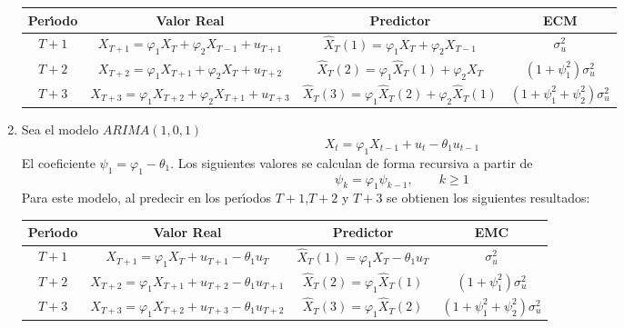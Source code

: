 \begin{ejemplo}
\begin{enumerate}
\begin{center}\small
\begin{tabular}{@{}cccc@{}}
\toprule
\textbf{Per\'{\i}odo}& \textbf{Valor Real}& \textbf{Predictor}& \textbf{ECM} \\
\midrule
$T+1$& $X_{T+1} =\varphi_{1} X_{T} +\varphi_{2} X_{T-1} +u_{T+1} $& $\widehat{{X}}_{T} \left( 1 \right)=\varphi_{1} X_{T} +\varphi_{2} X_{T-1} $& $\sigma_{u}^{2}$ \\[5pt]
$T+2$& $X_{T+2} =\varphi_{1} X_{T+1} +\varphi_{2} X_{T} +u_{T+2} $& $\widehat{{X}}_{T} \left( 2 \right)=\varphi_{1} \widehat{{X}}_{T} \left( 1 \right)+\varphi_{2} X_{T} $& 
$\left( {1+\psi_{1}^{2} } \right)\sigma_{u}^{2} $ \\[5pt]
$T+3$& $X_{T+3} =\varphi_{1} X_{T+2} +\varphi_{2} X_{T+1} +u_{T+3} $& $\widehat{{X}}_{T} \left( 3 \right)=\varphi_{1} \widehat{{X}}_{T} \left( 2 \right)+\varphi_{2} \widehat{{X}}_{T} \left( 1 \right)$& $\left( {1+\psi_{1}^{2} +\psi_{2}^{2} } \right)\sigma_{u}^{2} $ \\
\bottomrule
\end{tabular}
\end{center}


\item Sea el modelo $ARIMA( {1,0,1})$
\[
X_{t} =\varphi_{1} X_{t-1} +u_{t} -\theta_{1} u_{t-1} 
\]
El coeficiente $\psi_{1} =\varphi_{1} -\theta_{1} .$ Los siguientes 
valores se calculan de forma recursiva a partir de
\[
\psi_{k} =\varphi_{1} \psi_{k-1} ,\quad \quad k\ge 1
\]
Para este modelo, al predecir en los per\'{\i}odos 
$T+1$,$T+2$ y $T+3$ se obtienen los siguientes resultados:


\begin{center}\small
\begin{tabular}{@{}cccc@{}}
\toprule
\textbf{Per\'{\i}odo}& \textbf{Valor Real}& \textbf{Predictor}& \textbf{EMC} \\
\midrule
$T+1$& $X_{T+1} =\varphi_{1} X_{T} +u_{T+1} -\theta_{1} u_{T} $& $\widehat{X}_{T} (1)=\varphi_{1} X_{T} -\theta_{1} u_{T} $& $\sigma_{u}^{2} $ \\[5pt]
$T+2$& $X_{T+2} =\varphi_{1} X_{T+1} +u_{T+2} -\theta_{1} u_{T+1} $& $\widehat{X}_{T} (2)=\varphi_{1} \widehat{X}_{T} (1)$& $\left( {1+\psi_{1}^{2} } \right)\sigma_{u}^{2} $ \\[5pt]
$T+3$& $X_{T+3} =\varphi_{1} X_{T+2} +u_{T+3} -\theta_{1} u_{T+2} $& $\widehat{X}_{T} (3)=\varphi_{1} \widehat{X}_{T} (2)$& $\left( {1+\psi_{1}^{2} +\psi_{2}^{2} } \right)\sigma_{u}^{2} $ \\
\bottomrule
\end{tabular}

\end{center}
\end{enumerate}
\end{ejemplo}


